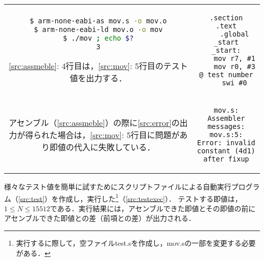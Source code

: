 \begin{tabular}[c]{cc}
    \begin{minipage}[t]{0.45\textwidth}
        \centering
        \begin{lstlisting}[caption={アセンブル},label={src:assmeble},language={Bash},frame={left}]
$ arm-none-eabi-as mov.s -o mov.o
$ arm-none-eabi-ld mov.o -o mov
$ ./mov ; echo $?
3
    \end{lstlisting}
        \begin{flushleft}
            \ref{src:assmeble}: 4行目は，\ref{src:mov}: 5行目のテスト値を出力する．
        \end{flushleft}
    \end{minipage} &
    \begin{minipage}[t]{0.45\textwidth}
        \centering
        \begin{lstlisting}[caption={{\ttfamily mov.s}},label={src:mov},frame={left}]
    .section    .text
    .global     _start
_start:
    mov r7, #1
    mov r0, #3 @ test number
    swi #0
\end{lstlisting}
    \end{minipage}
    \vspace{0.5em}                                                                          \\
    \begin{minipage}[c]{0.45\textwidth}
        アセンブル（\ref{src:assmeble}）の際に\ref{src:error}の出力が得られた場合は，\ref{src:mov}: 5行目に問題があり即値の代入に失敗している．
    \end{minipage}
    \hspace{1em}                                                                          &
    \begin{minipage}[c]{0.45\textwidth}
        \begin{lstlisting}[numbers={none},caption={Error出力},label={src:error},frame={single}]
mov.s: Assembler messages:
mov.s:5: Error: invalid constant (4d1) after fixup
    \end{lstlisting}
    \end{minipage}
\end{tabular}
様々なテスト値を簡単に試すためにスクリプトファイルによる自動実行プログラム（\ref{src:test}）を作成し，実行した\footnote{実行するに際して，空ファイル{\ttfamily test.s}を作成し，{\ttfamily mov.s}の一部を変更する必要がある．}（\ref{src:testexec}）．
テストする即値は，\(1\leq N\leq 15512\)である．実行結果には，アセンブルできた即値とその即値の前にアセンブルできた即値との差（前項との差）が出力される．\par
